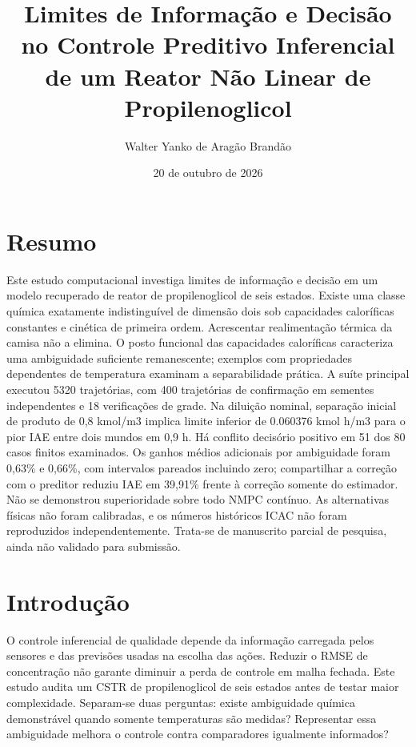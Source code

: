\documentclass[
  11pt,
]{article}
\title{Limites de Informação e Decisão no Controle Preditivo Inferencial
de um Reator Não Linear de Propilenoglicol}
\author{Walter Yanko de Aragão Brandão}
\date{20 de outubro de 2026}
\begin{document}
\maketitle

\hypertarget{resumo}{%
\section{Resumo}\label{resumo}}

Este estudo computacional investiga limites de informação e decisão em
um modelo recuperado de reator de propilenoglicol de seis estados.
Existe uma classe química exatamente indistinguível de dimensão dois sob
capacidades caloríficas constantes e cinética de primeira ordem.
Acrescentar realimentação térmica da camisa não a elimina. O posto
funcional das capacidades caloríficas caracteriza uma ambiguidade
suficiente remanescente; exemplos com propriedades dependentes de
temperatura examinam a separabilidade prática. A suíte principal
executou 5320 trajetórias, com 400 trajetórias de confirmação em
sementes independentes e 18 verificações de grade. Na diluição nominal,
separação inicial de produto de 0,8 kmol/m3 implica limite inferior de
0.060376 kmol h/m3 para o pior IAE entre dois mundos em 0,9 h. Há
conflito decisório positivo em 51 dos 80 casos finitos examinados. Os
ganhos médios adicionais por ambiguidade foram 0,63\% e 0,66\%, com
intervalos pareados incluindo zero; compartilhar a correção com o
preditor reduziu IAE em 39,91\% frente à correção somente do estimador.
Não se demonstrou superioridade sobre todo NMPC contínuo. As
alternativas físicas não foram calibradas, e os números históricos ICAC
não foram reproduzidos independentemente. Trata-se de manuscrito parcial
de pesquisa, ainda não validado para submissão.

\hypertarget{introduuxe7uxe3o}{%
\section{Introdução}\label{introduuxe7uxe3o}}

O controle inferencial de qualidade depende da informação carregada
pelos sensores e das previsões usadas na escolha das ações. Reduzir o
RMSE de concentração não garante diminuir a perda de controle em malha
fechada. Este estudo audita um CSTR de propilenoglicol de seis estados
antes de testar maior complexidade. Separam-se duas perguntas: existe
ambiguidade química demonstrável quando somente temperaturas são
medidas? Representar essa ambiguidade melhora o controle contra
comparadores igualmente informados?
\end{document}
